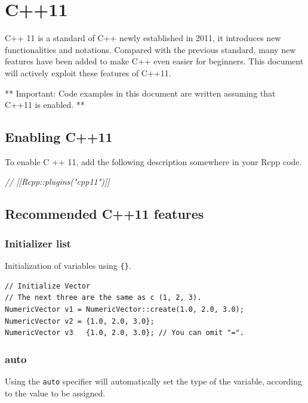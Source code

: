 \documentclass[]{book}
\newenvironment{Shaded}{\begin{snugshade}}{\end{snugshade}}
\newcommand{\CommentTok}[1]{\textcolor[rgb]{0.56,0.35,0.01}{\textit{#1}}}
\theoremstyle{definition}
\theoremstyle{definition}
\theoremstyle{remark}
\begin{document}
\chapter{C++11}\label{c11}

C++ 11 is a standard of C++ newly established in 2011, it introduces new
functionalities and notations. Compared with the previous standard, many
new features have been added to make C++ even easier for beginners. This
document will actively exploit these features of C++11.

** Important: Code examples in this document are written assuming that
C++11 is enabled. **

\section{Enabling C++11}\label{enabling-c11}

To enable C ++ 11, add the following description somewhere in your Rcpp
code.

\begin{Shaded}
\begin{Highlighting}[]
\CommentTok{// [[Rcpp::plugins("cpp11")]]}
\end{Highlighting}
\end{Shaded}

\section{Recommended C++11 features}\label{recommended-c11-features}

\subsection{Initializer list}\label{initializer-list}

Initialization of variables using \texttt{\{\}}.

\begin{verbatim}
// Initialize Vector
// The next three are the same as c (1, 2, 3).
NumericVector v1 = NumericVector::create(1.0, 2.0, 3.0);
NumericVector v2 = {1.0, 2.0, 3.0};
NumericVector v3   {1.0, 2.0, 3.0}; // You can omit "=".
\end{verbatim}

\subsection{auto}\label{auto}

Using the \texttt{auto} specifier will automatically set the type of the
variable, according to the value to be assigned.
\end{document}
